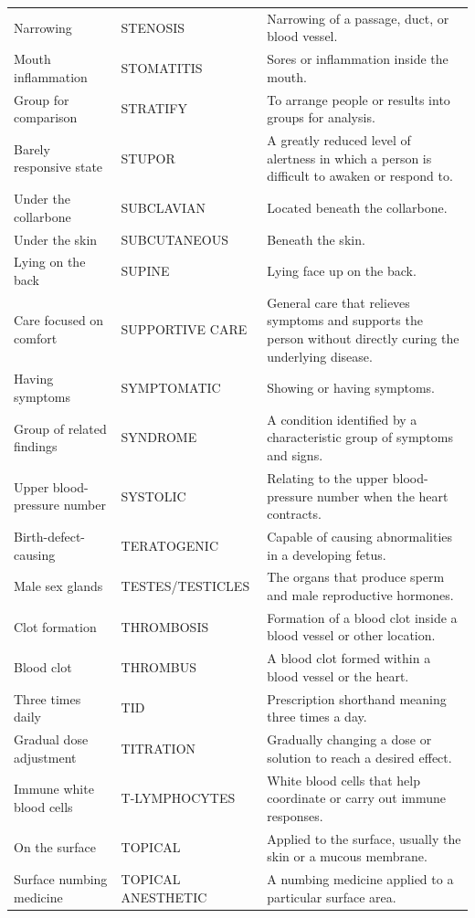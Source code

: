 \begin{longtable}{>{\raggedright\arraybackslash}p{} >{\raggedright\arraybackslash}p{} >{\raggedright\arraybackslash}p{}}
Narrowing & STENOSIS & Narrowing of a passage, duct, or blood vessel. \\
Mouth inflammation & STOMATITIS & Sores or inflammation inside the mouth. \\
Group for comparison & STRATIFY & To arrange people or results into groups for analysis. \\
Barely responsive state & STUPOR & A greatly reduced level of alertness in which a person is difficult to awaken or respond to. \\
Under the collarbone & SUBCLAVIAN & Located beneath the collarbone. \\
Under the skin & SUBCUTANEOUS & Beneath the skin. \\
Lying on the back & SUPINE & Lying face up on the back. \\
Care focused on comfort & SUPPORTIVE CARE & General care that relieves symptoms and supports the person without directly curing the underlying disease. \\
Having symptoms & SYMPTOMATIC & Showing or having symptoms. \\
Group of related findings & SYNDROME & A condition identified by a characteristic group of symptoms and signs. \\
Upper blood-pressure number & SYSTOLIC & Relating to the upper blood-pressure number when the heart contracts. \\
Birth-defect-causing & TERATOGENIC & Capable of causing abnormalities in a developing fetus. \\
Male sex glands & TESTES/TESTICLES & The organs that produce sperm and male reproductive hormones. \\
Clot formation & THROMBOSIS & Formation of a blood clot inside a blood vessel or other location. \\
Blood clot & THROMBUS & A blood clot formed within a blood vessel or the heart. \\
Three times daily & TID & Prescription shorthand meaning three times a day. \\
Gradual dose adjustment & TITRATION & Gradually changing a dose or solution to reach a desired effect. \\
Immune white blood cells & T-LYMPHOCYTES & White blood cells that help coordinate or carry out immune responses. \\
On the surface & TOPICAL & Applied to the surface, usually the skin or a mucous membrane. \\
Surface numbing medicine & TOPICAL ANESTHETIC & A numbing medicine applied to a particular surface area. \\

\end{longtable}
